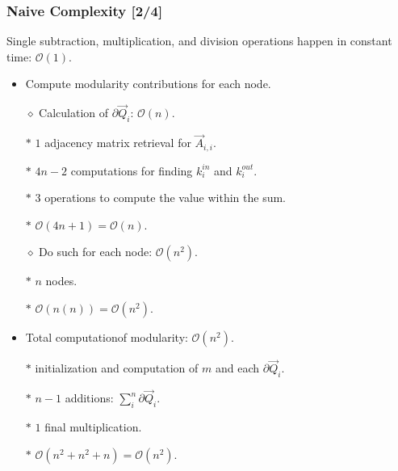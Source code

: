 \documentclass{beamer}
\begin{document}
\begin{frame}

    \frametitle{Naive Complexity [2/4]}

    Single subtraction, multiplication, and division operations happen in constant time: $ \mathcal{O}(1) $.\pause

    \vspace{2.5mm}
    \begin{itemize}
        \item Compute modularity contributions for each node.\pause
        \item[$\diamond$] Calculation of $ \partial \vec{Q}_{i} $: $ \mathcal{O}(n) $.\pause
        \item[$\ast$] $ 1 $ adjacency matrix retrieval for $ \vec{A}_{i, i} $.\pause
        \item[$\ast$] $ 4n -2 $ computations for finding $ k_{i}^{in} $ and $ k_{i}^{out} $.\pause
        \item[$\ast$] $ 3 $ operations to compute the value within the sum.\pause
        \item[$\ast$] $ \mathcal{O}(4n + 1) = \mathcal{O}(n) $.\pause
        \item[$\diamond$] Do such for each node: $ \mathcal{O}(n^{2}) $.\pause
        \item[$\ast$] $ n $ nodes.\pause
        \item[$\ast$] $ \mathcal{O}(n(n)) = \mathcal{O}(n^{2}) $.\pause
        \item Total computationof modularity: $ \mathcal{O}(n^{2}) $.\pause
        \item[$\ast$] initialization and computation of $ m $ and each $ \partial \vec{Q}_{i} $.\pause
        \item[$\ast$] $ n - 1 $ additions: $ \sum_{i}^{n} \partial \vec{Q}_{i} $.\pause
        \item[$\ast$] $ 1 $ final multiplication.\pause
        \item[$\ast$] $ \mathcal{O}(n^{2} + n^{2} + n) = \mathcal{O}(n^{2}) $.
    \end{itemize}

\end{frame}
\end{document}
